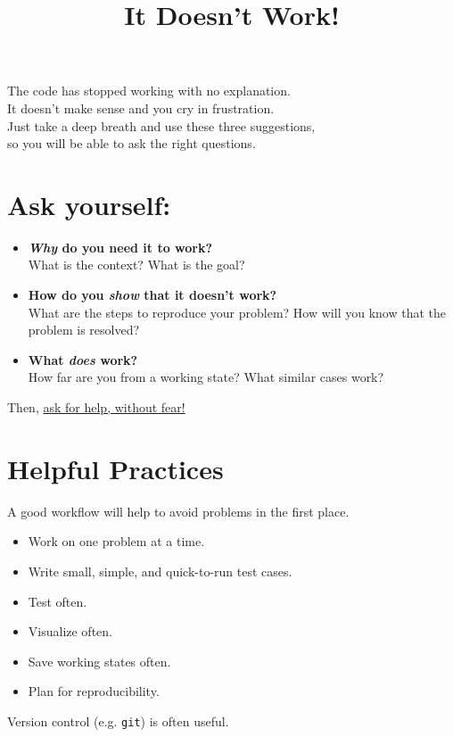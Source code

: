 \documentclass{article}
\title{\textbf{It Doesn't Work!}}
\date{}
\author{}
\begin{document}
\maketitle
\vspace{-50pt}

\begin{center}
The code has stopped working with no explanation.\\
It doesn't make sense and you cry in frustration.\\
Just take a deep breath and use these three suggestions,\\
so you will be able to ask the right questions.\\
\end{center}

\section*{Ask yourself:}
\begin{itemize}
\item \textbf{\emph{Why} do you need it to work?}\\
What is the context?
What is the goal?

\item \textbf{How do you \emph{show} that it doesn't work?}\\
What are the steps to reproduce your problem?
How will you know that the problem is resolved?

\item \textbf{What \emph{does} work?}\\
How far are you from a working state?
What similar cases work?
\end{itemize}

Then, \underline{ask for help, without fear!}

\vspace{10pt}

\section*{Helpful Practices}
A good workflow will help to avoid problems in the first place.
\begin{itemize}
\item Work on one problem at a time.
\item Write small, simple, and quick-to-run test cases.
\item Test often.
\item Visualize often.
\item Save working states often.
\item Plan for reproducibility.
\end{itemize}
Version control (e.g. \texttt{git}) is often useful.
\end{document}
